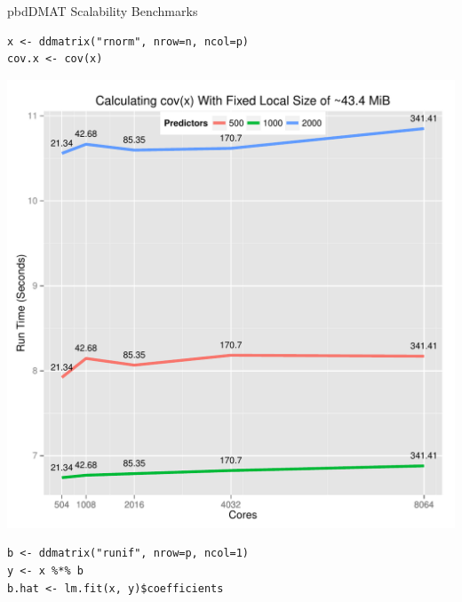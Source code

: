 \begin{frame}[fragile]
  \begin{block}{pbdDMAT Scalability Benchmarks}
    \begin{minipage}{0.44\textwidth}
      \vspace{-3ex}
      \begin{lstlisting}
x <- ddmatrix("rnorm", nrow=n, ncol=p)
cov.x <- cov(x)
      \end{lstlisting}
      \vspace{-3ex}
      \begin{center}
        \includegraphics[trim=3mm 1mm 2mm 11.5mm,clip,width=.98\textwidth]{../common/pics/cov}
      \end{center}
    \end{minipage}
    \begin{minipage}{0.55\textwidth}
      \vspace{-3.5ex}
      \begin{lstlisting}
b <- ddmatrix("runif", nrow=p, ncol=1)
y <- x %*% b
b.hat <- lm.fit(x, y)$coefficients
      \end{lstlisting} %
      \vspace{-3ex}
      \begin{center}

\end{center}
\end{minipage}
\end{block}
\end{frame}
